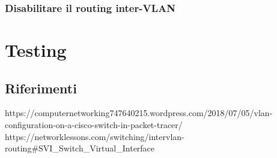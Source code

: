 \documentclass[a4paper,12pt]{report}
\begin{document}
\subsection{Disabilitare il routing inter-VLAN}
\chapter{Testing}
\label{chap:testing}
\section{Riferimenti}
https://computernetworking747640215.wordpress.com/2018/07/05/vlan-configuration-on-a-cisco-switch-in-packet-tracer/
%
https://networklessons.com/switching/intervlan-routing#SVI_Switch_Virtual_Interface
\end{document}
